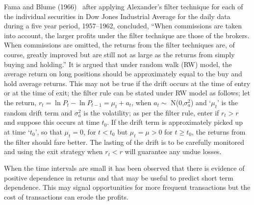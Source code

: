 Fama and Blume (1966)~\cite{famablume} after applying Alexander's filter technique for each of the individual securities in Dow Jones Industrial Average for the daily data during a five year period, 1957--1962, concluded, ``When commissions are taken into account, the larger profits under the filter technique are those of the brokers. When commissions are omitted, the returns from the filter techniques are, of course, greatly improved but are still not as large as the returns from simply buying and holding.'' It is argued that under random walk (RW) model, the average return on long positions should be approximately equal to the buy and hold average returns. This may not be true if the drift occurs at the time of entry or at the time of exit; the filter rule can be stated under RW model as follows; let the return, $r_{t} = \ln{P_{t}} - \ln{P_{t-1}} = \mu_{t} + a_{t}$, when $a_{t} \sim$ N(0,$\sigma_{a}^2$) and `$\mu_{t}$' is the random drift term and $\sigma_{a}^2$ is the volatility; as per the filter rule, enter if $r_{t} > r$ and suppose this occurs at time $t_{0}$. If the drift term is approximately picked up at time `$t_{0}$', so that $\mu_{t} = 0$, for $t < t_{0}$ but $\mu_{t} = \mu > 0$ for $t \geq t_{0}$, the returns from the filter should fare better. The lasting of the drift is to be carefully monitored and using the exit strategy when $r_{t} < r$ will guarantee any undue losses.


When the time intervals are small it has been observed that there is evidence of positive dependence in returns and that may be useful to predict short term dependence. This may signal opportunities for more frequent transactions but the cost of transactions can erode the profits. \twomedskip


